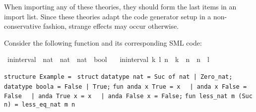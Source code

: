 \begin{isabellebody}
\begin{isamarkuptext}
  \begin{warn}
    When importing any of these theories, they should form the last
    items in an import list.  Since these theories adapt the
    code generator setup in a non-conservative fashion,
    strange effects may occur otherwise.
  \end{warn}%
\end{isamarkuptext}%
\isamarkuptrue%
%
\isamarkuptrue%
%
\begin{isamarkuptext}%
Consider the following function and its corresponding
  SML code:%
\end{isamarkuptext}%
\isamarkuptrue%
%
\isadelimquote
%
\endisadelimquote
%
\isatagquote
{}\isamarkupfalse%
\ in{\isacharunderscore}interval\ {\isacharcolon}{\isacharcolon}\ {\isachardoublequoteopen}nat\ {\isasymtimes}\ nat\ {\isasymRightarrow}\ nat\ {\isasymRightarrow}\ bool{\isachardoublequoteclose}\ \isanewline
\ \ {\isachardoublequoteopen}in{\isacharunderscore}interval\ {\isacharparenleft}k{\isacharcomma}\ l{\isacharparenright}\ n\ {\isasymlongleftrightarrow}\ k\ {\isasymle}\ n\ {\isasymand}\ n\ {\isasymle}\ l{\isachardoublequoteclose}%
\endisatagquote
{\isafoldquote}%
%
\isadelimquote
%
\endisadelimquote
%
\isadeliminvisible
%
\endisadeliminvisible
%
\isataginvisible
%
\endisataginvisible
{\isafoldinvisible}%
%
\isadeliminvisible
%
\endisadeliminvisible
%
\isadelimquote
%
\endisadelimquote
%
\isatagquote
%
\begin{isamarkuptext}%
\isaverbatim%
\noindent%
\verb|structure Example = |\newline%
\verb|struct|\newline%
\newline%
\verb|datatype nat = Suc of nat |\verb,|,\verb| Zero_nat;|\newline%
\newline%
\verb|datatype boola = False |\verb,|,\verb| True;|\newline%
\newline%
\verb|fun anda x True = x|\newline%
\verb|  |\verb,|,\verb| anda x False = False|\newline%
\verb|  |\verb,|,\verb| anda True x = x|\newline%
\verb|  |\verb,|,\verb| anda False x = False;|\newline%
\newline%
\verb|fun less_nat m (Suc n) = less_eq_nat m n|\newline%

\end{isamarkuptext}
\end{isabellebody}
